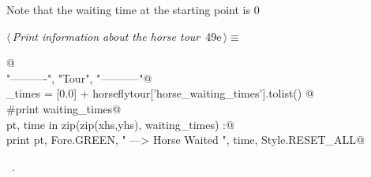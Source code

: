 \documentclass[11.5pt]{report}
\begin{document}
\vspace{-0.8cm} \newchunk  Note that the waiting time at the starting point is 0
\begin{flushleft} \small\label{scrap77}\raggedright\small
{} $\langle\,${\itshape Print information about the horse tour}\nobreak\ {\footnotesize {49e}}$\,\rangle\equiv$
\vspace{-1ex}
\begin{list}{}{} \item
\mbox{}\verb@   @\\
\mbox{}\verb@print "\n----------", "\nHorse Tour", "\n-----------"@\\
\mbox{}\verb@waiting_times = [0.0] + horseflytour['horse_waiting_times'].tolist() @\\
\mbox{}\verb@#print waiting_times@\\
\mbox{}\verb@for pt, time in zip(zip(xhs,yhs), waiting_times) :@\\
\mbox{}\verb@   print pt, Fore.GREEN, " ---> Horse Waited ", time, Style.RESET_ALL@\\
\mbox{}\verb@@{\NWsep}
\end{list}
\vspace{-1.5ex}
\footnotesize
\begin{list}{}{\setlength{\itemsep}{-\parsep}\setlength{\itemindent}{-\leftmargin}}
\item \NWtxtMacroRefIn\ .

\item{}
\end{list}
\vspace{4ex}
\end{flushleft}
\end{document}
